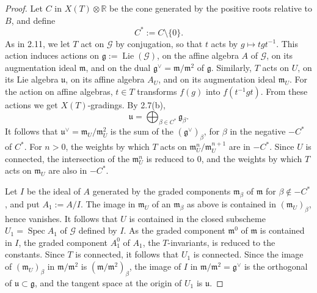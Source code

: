 \documentclass[11pt]{article}
\newcommand{\Lie}{\operatorname{Lie}}
\begin{document}
\begin{proof}
Let \(C\) in \(X(T)\otimes\mathbb R\) be the cone generated by the positive roots
relative to \(B\), and define
\begin{equation}
  C^*:=C\setminus\{0\}.\tag{2.12.1}
\end{equation}
As in 2.11, we let \(T\) act on \(\mathcal G\) by conjugation, so that \(t\) acts by
\(g\mapsto tgt^{-1}\). This action induces actions on
\(\mathfrak g:=\Lie(\mathcal G)\), on the affine algebra \(A\) of \(\mathcal G\), on
its augmentation ideal \(\mathfrak m\), and on the dual
\(\mathfrak g^\vee=\mathfrak m/\mathfrak m^2\) of \(\mathfrak g\). Similarly, \(T\)
acts on \(U\), on its Lie algebra \(\mathfrak u\), on its affine algebra \(A_U\), and
on its augmentation ideal \(\mathfrak m_U\). For the action on affine algebras,
\(t\in T\) transforms \(f(g)\) into \(f(t^{-1}gt)\). From these actions we get
\(X(T)\)-gradings. By 2.7(b),
\begin{equation}
  \mathfrak u=\bigoplus_{\beta\in C^*} \mathfrak g_\beta .
  \tag{2.12.2}
\end{equation}
It follows that \(\mathfrak u^\vee=\mathfrak m_U/\mathfrak m_U^2\) is the sum of the
\((\mathfrak g^\vee)_\beta\), for \(\beta\) in the negative \(-C^*\) of \(C^*\). For
\(n>0\), the weights by which \(T\) acts on
\(\mathfrak m_U^n/\mathfrak m_U^{n+1}\) are in \(-C^*\). Since \(U\) is connected,
the intersection of the \(\mathfrak m_U^n\) is reduced to \(0\), and the weights by
which \(T\) acts on \(\mathfrak m_U\) are also in \(-C^*\).

Let \(I\) be the ideal of \(A\) generated by the graded components \(\mathfrak m_\beta\)
of \(\mathfrak m\) for \(\beta\notin -C^*\), and put \(A_1:=A/I\). The image in
\(\mathfrak m_U\) of an \(\mathfrak m_\beta\) as above is contained in
\((\mathfrak m_U)_\beta\), hence vanishes. It follows that \(U\) is contained in the
closed subscheme \(U_1=\operatorname{Spec} A_1\) of \(\mathcal G\) defined by \(I\).
As the graded component \(\mathfrak m^0\) of \(\mathfrak m\) is contained in \(I\),
the graded component \(A_1^0\) of \(A_1\), the \(T\)-invariants, is reduced to the
constants. Since \(T\) is connected, it follows that \(U_1\) is connected. Since the
image of \((\mathfrak m_U)_\beta\) in \(\mathfrak m/\mathfrak m^2\) is
\((\mathfrak m/\mathfrak m^2)_\beta\), the image of \(I\) in
\(\mathfrak m/\mathfrak m^2=\mathfrak g^\vee\) is the orthogonal of
\(\mathfrak u\subset \mathfrak g\), and the tangent space at the origin of \(U_1\) is
\(\mathfrak u\).


\end{proof}
\end{document}

